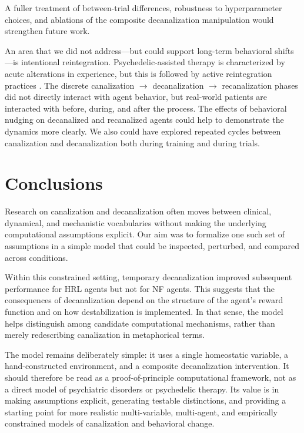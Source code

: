 \documentclass[12pt,fleqn]{article}
\begin{document}
A fuller treatment of between-trial differences, robustness to hyperparameter choices, and ablations of the composite decanalization manipulation would strengthen future work.

An area that we did not address—but could support long-term behavioral shifts—is intentional reintegration. Psychedelic-assisted therapy is characterized by acute alterations in experience, but this is followed by active reintegration practices \cite{bathje_psychedelic_2022}. The discrete canalization \(\rightarrow\) decanalization \(\rightarrow\) recanalization phases did not directly interact with agent behavior, but real-world patients are interacted with before, during, and after the process. The effects of behavioral nudging on decanalized and recanalized agents could help to demonstrate the dynamics more clearly. We also could have explored repeated cycles between canalization and decanalization both during training and during trials.


\section{Conclusions}

Research on canalization and decanalization often moves between clinical, dynamical, and mechanistic vocabularies without making the underlying computational assumptions explicit. Our aim was to formalize one such set of assumptions in a simple model that could be inspected, perturbed, and compared across conditions.

Within this constrained setting, temporary decanalization improved subsequent performance for HRL agents but not for NF agents. This suggests that the consequences of decanalization depend on the structure of the agent's reward function and on how destabilization is implemented. In that sense, the model helps distinguish among candidate computational mechanisms, rather than merely redescribing canalization in metaphorical terms.

The model remains deliberately simple: it uses a single homeostatic variable, a hand-constructed environment, and a composite decanalization intervention. It should therefore be read as a proof-of-principle computational framework, not as a direct model of psychiatric disorders or psychedelic therapy. Its value is in making assumptions explicit, generating testable distinctions, and providing a starting point for more realistic multi-variable, multi-agent, and empirically constrained models of canalization and behavioral change.
\end{document}
